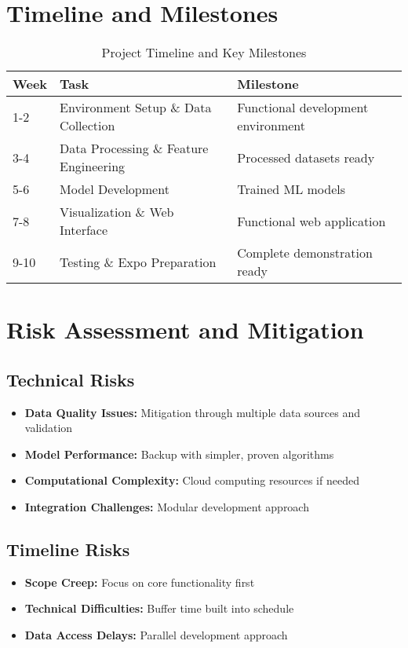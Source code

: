 \documentclass[12pt,a4paper]{article}
\begin{document}
\section{Timeline and Milestones}

\begin{table}[h!]
\centering
\begin{tabular}{|l|l|l|}
\hline
\textbf{Week} & \textbf{Task} & \textbf{Milestone} \\
\hline
1-2 & Environment Setup \& Data Collection & Functional development environment \\
\hline
3-4 & Data Processing \& Feature Engineering & Processed datasets ready \\
\hline
5-6 & Model Development & Trained ML models \\
\hline
7-8 & Visualization \& Web Interface & Functional web application \\
\hline
9-10 & Testing \& Expo Preparation & Complete demonstration ready \\
\hline
\end{tabular}
\caption{Project Timeline and Key Milestones}
\end{table}

\section{Risk Assessment and Mitigation}

\subsection{Technical Risks}
\begin{itemize}
    \item \textbf{Data Quality Issues:} Mitigation through multiple data sources and validation
    \item \textbf{Model Performance:} Backup with simpler, proven algorithms
    \item \textbf{Computational Complexity:} Cloud computing resources if needed
    \item \textbf{Integration Challenges:} Modular development approach
\end{itemize}

\subsection{Timeline Risks}
\begin{itemize}
    \item \textbf{Scope Creep:} Focus on core functionality first
    \item \textbf{Technical Difficulties:} Buffer time built into schedule
    \item \textbf{Data Access Delays:} Parallel development approach
\end{itemize}
\end{document}
